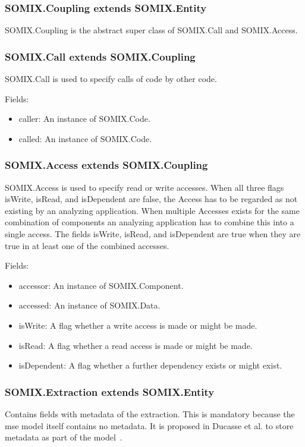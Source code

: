 \documentclass[preprint,12pt]{elsarticle}
\begin{document}
\subsubsection{SOMIX.Coupling extends SOMIX.Entity}

SOMIX.Coupling is the abstract super class of SOMIX.Call and SOMIX.Access.

\subsubsection{SOMIX.Call extends SOMIX.Coupling}

SOMIX.Call is used to specify calls of code by other code.

Fields:
\begin{itemize}
\item caller: An instance of SOMIX.Code.
\item called: An instance of SOMIX.Code.
\end{itemize}

\subsubsection{SOMIX.Access extends SOMIX.Coupling}
SOMIX.Access is used to specify read or write accesses. When all three flags isWrite, isRead, and isDependent are false, the Access has to be regarded as not existing by an analyzing application. When multiple Accesses exists for the same combination of components an analyzing application has to combine this into a single access. The fields isWrite, isRead, and isDependent are true when they are true in at least one of the combined accesses.

Fields:
\begin{itemize}
\item accessor: An instance of SOMIX.Component.
\item accessed: An instance of SOMIX.Data.
\item isWrite: A flag whether a write access is made or might be made.
\item isRead: A flag whether a read access is made or might be made. 
\item isDependent: A flag whether a further dependency exists or might exist.
\end{itemize}



\subsubsection{SOMIX.Extraction extends SOMIX.Entity}
Contains fields with metadata of the extraction. This is mandatory because the mse model itself contains no metadata. It is proposed in Ducasse et al. to store metadata as part of the model~\cite{r_Ducasse_2011}.
\end{document}
